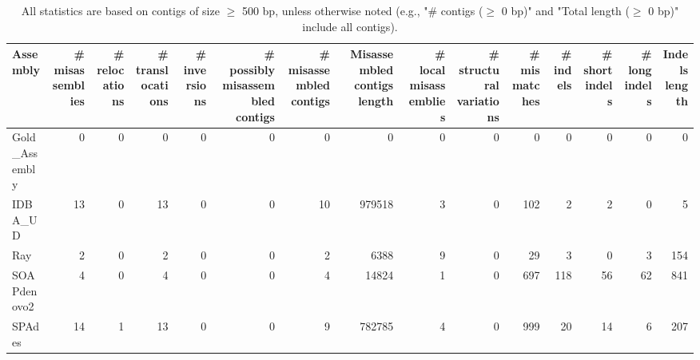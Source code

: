 \documentclass[12pt,a4paper]{article}
\begin{document}
\begin{table}[ht]
\begin{center}
\caption{All statistics are based on contigs of size $\geq$ 500 bp, unless otherwise noted (e.g., "\# contigs ($\geq$ 0 bp)" and "Total length ($\geq$ 0 bp)" include all contigs).}
\begin{tabular}{|l*{14}{|r}|}
\hline
Assembly & \# misassemblies &     \# relocations &     \# translocations &     \# inversions & \# possibly misassembled contigs & \# misassembled contigs & Misassembled contigs length & \# local misassemblies & \# structural variations & \# mismatches & \# indels &     \# short indels &     \# long indels & Indels length \\ \hline
Gold\_Assembly & 0 & 0 & 0 & 0 & 0 & 0 & 0 & 0 & 0 & 0 & 0 & 0 & 0 & 0 \\ \hline
IDBA\_UD & 13 & 0 & 13 & 0 & 0 & 10 & 979518 & 3 & 0 & 102 & 2 & 2 & 0 & 5 \\ \hline
Ray & 2 & 0 & 2 & 0 & 0 & 2 & 6388 & 9 & 0 & 29 & 3 & 0 & 3 & 154 \\ \hline
SOAPdenovo2 & 4 & 0 & 4 & 0 & 0 & 4 & 14824 & 1 & 0 & 697 & 118 & 56 & 62 & 841 \\ \hline
SPAdes & 14 & 1 & 13 & 0 & 0 & 9 & 782785 & 4 & 0 & 999 & 20 & 14 & 6 & 207 \\ \hline
\end{tabular}
\end{center}
\end{table}
\end{document}
